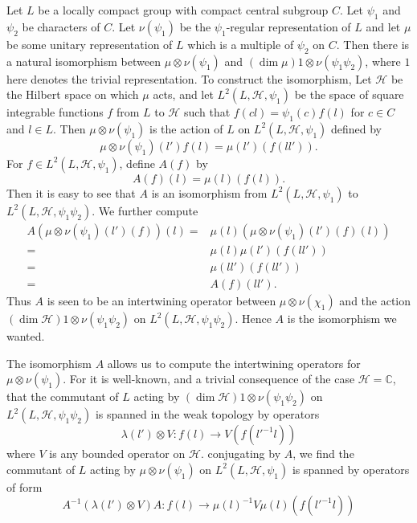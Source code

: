 \documentclass[12pt]{amsart}
\def\chh{{\mathcal{H}}}
\def\bC{{\mathbb{C}}}
\begin{document}
Let $L$ be a locally compact group with compact central subgroup $C$. 
Let $\psi_1$ and $\psi_2$ be characters of $C$. Let $\nu(\psi_1)$ 
be the $\psi_1$-regular representation of $L$ and let $\mu$ be some 
unitary representation of $L$ which is a multiple of $\psi_2$ on $C$. 
Then there is a natural isomorphism between 
$\mu\otimes \nu(\psi_1)$ and $(\dim \mu) 1\otimes \nu(\psi_1\psi_2)$, 
where $1$ here denotes the trivial representation. To construct the isomorphism,
Let $\chh$ be the Hilbert space on which $\mu$ acts, 
and let $L^2(L,\chh,\psi_1)$ be the space of 
square integrable functions $f$ from $L$ to $\chh$ such that 
$f(cl) = \psi_1(c)f(l)$ for $c\in C$ and $l\in L$. 
Then $\mu\otimes \nu(\psi_1)$ is the action of $L$ on $L^2(L,\chh,\psi_1)$
defined by 
\[
\mu \otimes \nu(\psi_1)(l')f(l) = \mu(l')(f(ll')).
\]
For $f\in L^2(L,\chh,\psi_1)$, define $A(f)$ by 
\[
A(f)(l) = \mu(l)(f(l)).
\]
Then it is easy to see that $A$ is an isomorphism from $L^2(L,\chh, \psi_1)$
to $L^2(L, \chh, \psi_1\psi_2)$. We further compute 
\[
\begin{split}
A(\mu\otimes \nu(\psi_1)(l')(f))(l) 
=& \mu(l)(\mu\otimes \nu(\psi_1)(l')(f)(l))\\
=& \mu(l)\mu(l')(f(ll'))\\
=&\mu(ll')(f(ll'))\\
=&A(f)(ll').
\end{split}
\]
Thus $A$ is seen to be an intertwining operator between $\mu\otimes \nu(\chi_1)$
and the action $(\dim \chh)1\otimes \nu(\psi_1\psi_2)$ on
$L^2(L, \chh, \psi_1\psi_2)$. Hence $A$ is the isomorphism we wanted. 

The isomorphism $A$ allows us to compute the intertwining operators 
for $\mu\otimes \nu(\psi_1)$. For it is well-known, and a trivial consequence
of the case $\chh=\bC$, that the commutant of $L$ acting by 
$(\dim \chh)1\otimes \nu(\psi_1\psi_2)$ on $L^2(L, \chh, \psi_1\psi_2)$ 
is spanned in the weak topology by operators 
\[
\lambda(l')\otimes V\colon f(l)\to V(f({l'}^{-1}l))
\]
where $V$ is any bounded operator on $\chh$. conjugating by $A$, we 
find the commutant of $L$ acting by $\mu\otimes \nu(\psi_1)$ 
on $L^2(L, \chh,\psi_1)$ is spanned by operators of form 
\begin{equation}\label{eq:27}
A^{-1}(\lambda(l')\otimes V)A\colon f(l) \to \mu(l)^{-1}V \mu(l)(f({l'}^{-1}l))
\end{equation}
\end{document}
